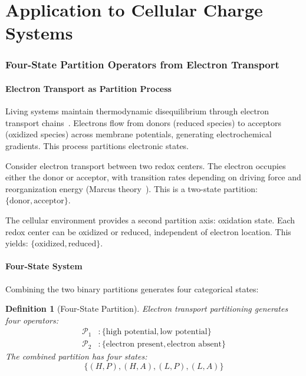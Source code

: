 \documentclass[twocolumn,aps,prb,superscriptaddress,longbibliography,floatfix]{revtex4-2}
\newtheorem{definition}[theorem]{Definition}
\theoremstyle{remark}
\begin{document}
\part{Application to Cellular Charge Systems}

\section{Four-State Partition Operators from Electron Transport}
\label{sec:fourstate}

\subsection{Electron Transport as Partition Process}

Living systems maintain thermodynamic disequilibrium through electron
transport chains~\cite{Nicholls2013,Mitchell1961}. Electrons flow from
donors (reduced species) to acceptors (oxidized species) across membrane
potentials, generating electrochemical gradients. This process partitions
electronic states.

Consider electron transport between two redox centers. The electron
occupies either the donor or acceptor, with transition rates depending on
driving force and reorganization energy (Marcus theory~\cite{Marcus1956}).
This is a two-state partition: $\{\text{donor}, \text{acceptor}\}$.

The cellular environment provides a second partition axis: oxidation
state. Each redox center can be oxidized or reduced, independent of
electron location. This yields: $\{\text{oxidized}, \text{reduced}\}$.

\subsection{Four-State System}

Combining the two binary partitions generates four categorical states:

\begin{definition}[Four-State Partition]
\label{def:fourstate}
Electron transport partitioning generates four operators:
\begin{align}
\mathcal{P}_1 &: \{\text{high potential}, \text{low potential}\} \\
\mathcal{P}_2 &: \{\text{electron present}, \text{electron absent}\}
\end{align}
The combined partition has four states:
\begin{equation}
\{(H,P), (H,A), (L,P), (L,A)\}
\end{equation}
\end{definition}
\end{document}
